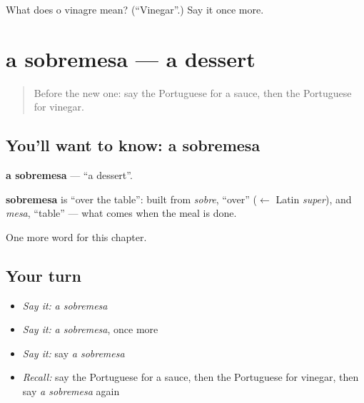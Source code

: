\begin{tcolorbox}[breakable,colback=teal!4,colframe=teal!35!black,title={Before you move on}]
What does o vinagre mean? (\textquotedblleft{}Vinegar\textquotedblright{}.) Say it once more.
\end{tcolorbox}
\section[a sobremesa]{a sobremesa — a dessert}

\label{lesson:PT-C107-sobremesa}



\begin{quote}
Before the new one: say the Portuguese for a sauce, then the Portuguese for vinegar.
\end{quote}

\subsection*{You'll want to know: a sobremesa}
\textbf{a sobremesa} — \textquotedblleft{}a dessert\textquotedblright{}.

\begin{cousinweb}
\textbf{sobremesa} is \textquotedblleft{}over the table\textquotedblright{}: built from \emph{sobre}, \textquotedblleft{}over\textquotedblright{} ($\leftarrow$ Latin \emph{super}), and \emph{mesa}, \textquotedblleft{}table\textquotedblright{} — what comes when the meal is done.
\end{cousinweb}

\begin{grammarlens}[title={What you've built}]
One more word for this chapter.
\end{grammarlens}

\subsection*{Your turn}
\begin{itemize}
\raggedright
  \item \emph{Say it:} \emph{a sobremesa}
  \item \emph{Say it:} \emph{a sobremesa}, once more
  \item \emph{Say it:} say \emph{a sobremesa}
  \item \emph{Recall:} say the Portuguese for a sauce, then the Portuguese for vinegar, then say \emph{a sobremesa} again
\end{itemize}

